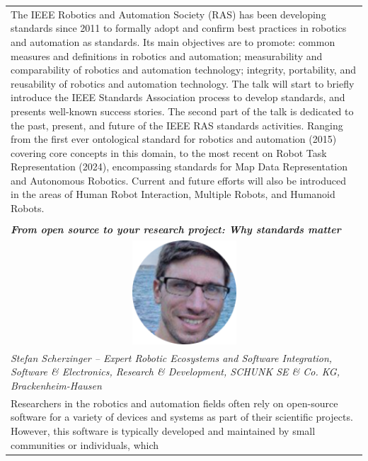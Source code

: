 \documentclass[
	openany, %
	parskip=full, %
	12pt, %
	a4paper, %
]{conferencebooklet} %
\begin{document}
\begin{multicols*}{2}
        \begin{tabular}{p{75mm}}
            The IEEE Robotics and Automation Society (RAS) has been developing standards since 2011 to formally adopt and confirm best practices in robotics and automation as standards. Its main objectives are to promote: common measures and definitions in robotics and automation; measurability and comparability of robotics and automation technology; integrity, portability, and reusability of robotics and automation technology.
            The talk will start to briefly introduce the IEEE Standards Association process to develop standards, and presents well-known success stories.
            The second part of the talk is dedicated to the past, present, and future of the IEEE RAS standards activities. Ranging from the first ever ontological standard for robotics and automation (2015) covering core concepts in this domain, to the most recent on Robot Task Representation (2024), encompassing standards for Map Data Representation and Autonomous Robotics. Current and future efforts will also be introduced in the areas of Human Robot Interaction, Multiple Robots, and Humanoid Robots. \\ \\ 
            
            \textit{\textbf{From open source to your research project: Why standards matter}} \vspace{2mm} \\
            \multicolumn{1}{c}{ \includegraphics[width=0.3\textwidth]{standardization/stefan-scherzinger.png}} \vspace{2mm} \\
            \textit{Stefan Scherzinger -- Expert Robotic Ecosystems and Software Integration, Software \& Electronics, Research \& Development, SCHUNK SE \& Co. KG, Brackenheim-Hausen} \vspace{2mm} \\
            Researchers in the robotics and automation fields often rely on open-source software for a variety of devices and systems as part of their scientific projects. 
            However, this software is typically developed and maintained by small communities or individuals, which 
        \end{tabular}
    

\end{multicols*}
\end{document}
